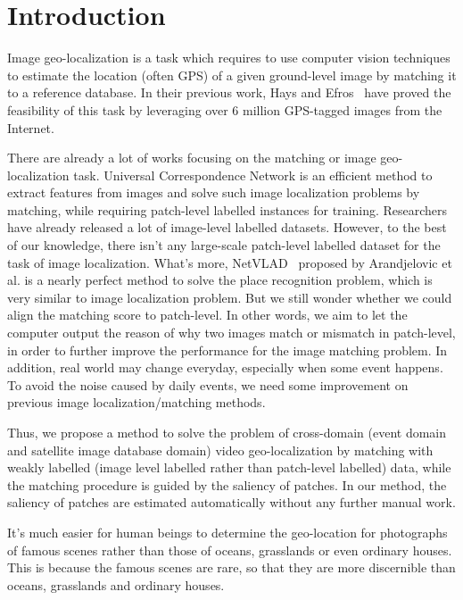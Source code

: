 \section{Introduction}
\par
Image geo-localization is a task which requires to use computer vision techniques to estimate the location (often GPS) of a given ground-level image by matching it to a reference database. In their previous work, Hays and Efros~\cite{hays2008im2gps} have proved the feasibility of this task by leveraging over 6 million GPS-tagged images from the Internet.
\par
There are already a lot of works focusing on the matching or image geo-localization task. Universal Correspondence Network\cite{choy_nips16} is an efficient method to extract features from images and solve such image localization problems by matching, while requiring patch-level labelled instances for training. Researchers have already released a lot of image-level labelled datasets. However, to the best of our knowledge, there isn't any large-scale patch-level labelled dataset for the task of image localization. What's more, NetVLAD~\cite{Arandjelovic16} proposed by Arandjelovic et al. is a nearly perfect method to solve the place recognition problem, which is very similar to image localization problem. But we still wonder whether we could align the matching score to patch-level. In other words, we aim to let the computer output the reason of why two images match or mismatch in patch-level, in order to further improve the performance for the image matching problem. In addition, real world may change everyday, especially when some event happens. To avoid the noise caused by daily events, we need some improvement on previous image localization/matching methods.
\par
Thus, we propose a method to solve the problem of cross-domain (event domain and satellite image database domain) video geo-localization by matching with weakly labelled (image level labelled rather than patch-level labelled) data, while the matching procedure is guided by the saliency of patches. In our method, the saliency of patches are estimated automatically without any further manual work.
\par
It's much easier for human beings to determine the geo-location for photographs of famous scenes rather than those of oceans, grasslands or even ordinary houses. This is because the famous scenes are rare, so that they are more discernible than oceans, grasslands and ordinary houses.
\par 
